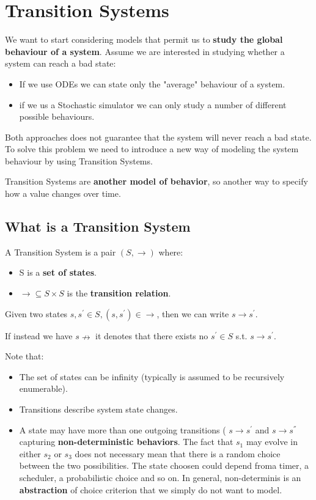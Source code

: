 \chapter{Transition Systems}
We want to start considering models that permit us to \textbf{study the global behaviour of a system}. Assume we are interested in studying whether a system can reach a bad state:
\begin{itemize}
    \item If we use ODEs we can state only the "average" behaviour of a system.
    \item if we us a Stochastic simulator we can only study a number of different possible behaviours.
\end{itemize}
Both approaches does not guarantee that the system will never reach a bad state. To solve this problem we need to introduce a new way of modeling the system behaviour by using Transition Systems.\par
Transition Systems are \textbf{another model of behavior}, so another way to specify how a value changes over time.

\section{What is a Transition System}
A Transition System is a pair $(S, \rightarrow)$ where:
\begin{itemize}
    \item S is a \textbf{set of states}.
    \item $\rightarrow \subseteq S \times S$ is the \textbf{transition relation}.
\end{itemize}
Given two states $s, s^{'} \in S, (s, s^') \in \rightarrow$, then we can write $s \rightarrow s^'$.\par 
If instead we have $s \nrightarrow$ it denotes that there exists no $s^' \in S$ s.t. $s \rightarrow s^'$.\par
Note that:

\begin{itemize}
    \item The set of states can be infinity (typically is assumed to be recursively enumerable).
    \item Transitions describe system state changes.
    \item A state may have more than one outgoing transitions ( $s \rightarrow s^'$ and $s \rightarrow s^{''}$ capturing \textbf{non-deterministic behaviors}. The fact that $s_1$ may evolve in either $s_2$ or $s_3$ does not necessary mean that there is a random choice between the two possibilities. The state choosen could depend froma timer, a scheduler, a probabilistic choice and so on. In general, non-determinis is an \textbf{abstraction} of choice criterion that we simply do not want to model.
\end{itemize}

